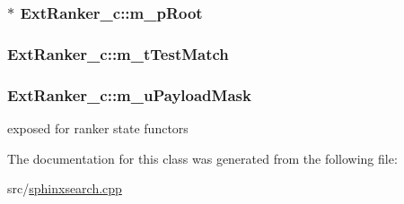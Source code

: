 \hypertarget{classExtRanker__c_a61e8fecdc5c1fce2a4fef58063f846bc}{
\subsubsection[{m\-\_\-p\-Root}]{$\ast$ Ext\-Ranker\-\_\-c\-::m\-\_\-p\-Root\hspace{0.3cm}{\ttfamily [protected]}}}\label{classExtRanker__c_a61e8fecdc5c1fce2a4fef58063f846bc}
\hypertarget{classExtRanker__c_adb2e4ad49ca02cbd256c2be47a3a5301}{
\subsubsection[{m\-\_\-t\-Test\-Match}]{ Ext\-Ranker\-\_\-c\-::m\-\_\-t\-Test\-Match\hspace{0.3cm}{\ttfamily [protected]}}}\label{classExtRanker__c_adb2e4ad49ca02cbd256c2be47a3a5301}
\hypertarget{classExtRanker__c_aaf89aef9263ba01d40f8778c141c547f}{
\subsubsection[{m\-\_\-u\-Payload\-Mask}]{ Ext\-Ranker\-\_\-c\-::m\-\_\-u\-Payload\-Mask}}\label{classExtRanker__c_aaf89aef9263ba01d40f8778c141c547f}


exposed for ranker state functors 



The documentation for this class was generated from the following file\-:\begin{DoxyCompactItemize}
\item 
src/\hyperlink{sphinxsearch_8cpp}{sphinxsearch.\-cpp}\end{DoxyCompactItemize}
